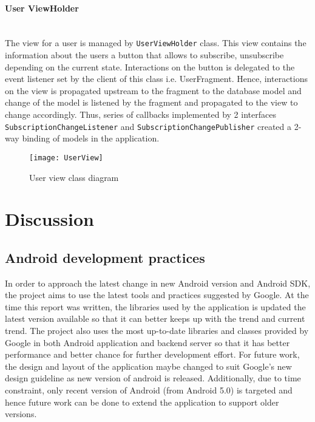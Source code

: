 \paragraph{User ViewHolder} \mbox{} \\
The view for a user is managed by \texttt{UserViewHolder} class. This view contains the information about the users a
button that allows to subscribe, unsubscribe depending on the current state. Interactions on the button is delegated to
the event listener set by the client of this class i.e. UserFragment. Hence, interactions on the view is propagated
upstream to the fragment to the database model and change of the model is listened by the fragment and propagated to the
view to change accordingly. Thus, series of callbacks implemented by 2 interfaces \texttt{SubscriptionChangeListener} and
\texttt{SubscriptionChangePublisher} created a 2-way binding of models in the application.

\begin{figure}[!ht]
    \caption{User view class diagram}
    \centering
    \texttt{[image: UserView]}
\end{figure}

\section{Discussion}
\subsection{Android development practices}
In order to approach the latest change in new Android version and Android SDK, the project aims to use the latest tools
and practices suggested by Google. At the time this report was written, the libraries used by the application is updated
the latest version available so that it can better keeps up with the trend and current trend. The project also uses the
most up-to-date libraries and classes provided by Google in both Android application and backend server so that it has
better performance and better chance for further development effort.
For future work, the design and layout of the application maybe changed to suit Google's new design guideline as new
version of android is released. Additionally, due to time constraint, only recent version of Android (from Android 5.0)
is targeted and hence future work can be done to extend the application to support older versions.

